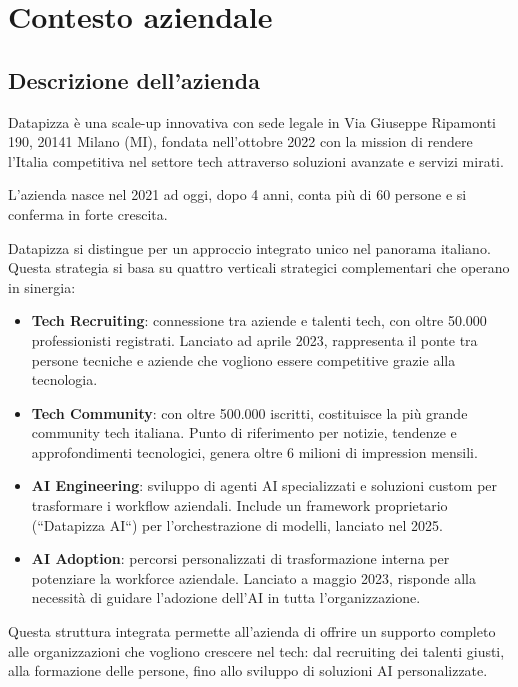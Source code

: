 \chapter{Contesto aziendale}
\sloppypar
\section{Descrizione dell'azienda}
Datapizza è una scale-up innovativa con sede legale in Via Giuseppe Ripamonti 190, 20141 Milano (MI), fondata nell'ottobre 2022 con la mission di rendere l'Italia competitiva nel settore tech attraverso soluzioni avanzate e servizi mirati.

L'azienda nasce nel 2021 ad oggi, dopo 4 anni, conta più di 60 persone e si conferma in forte crescita.

Datapizza si distingue per un approccio integrato unico nel panorama 
italiano. Questa strategia si basa su quattro verticali strategici 
complementari che operano in sinergia:


\begin{itemize}
  \item \textbf{Tech Recruiting}: connessione tra aziende e talenti tech, con oltre 50.000 professionisti registrati. Lanciato ad aprile 2023, rappresenta il ponte tra persone tecniche e aziende che vogliono essere competitive grazie alla tecnologia.
  
  \item \textbf{Tech Community}: con oltre 500.000 iscritti, costituisce la più grande community tech italiana. Punto di riferimento per notizie, tendenze e approfondimenti tecnologici, genera oltre 6 milioni di impression mensili.
  
  \item \textbf{AI Engineering}: sviluppo di agenti AI specializzati e soluzioni custom per trasformare i workflow aziendali. Include un framework proprietario (``Datapizza AI``) per l'orchestrazione di modelli, lanciato nel 2025.
  
  \item \textbf{AI Adoption}: percorsi personalizzati di trasformazione interna per potenziare la workforce aziendale. Lanciato a maggio 2023, risponde alla necessità di guidare l'adozione dell'AI in tutta l'organizzazione.
\end{itemize}

Questa struttura integrata permette all'azienda di offrire un supporto 
completo alle organizzazioni che vogliono crescere nel tech: dal 
recruiting dei talenti giusti, alla formazione delle persone, fino allo 
sviluppo di soluzioni AI personalizzate.

